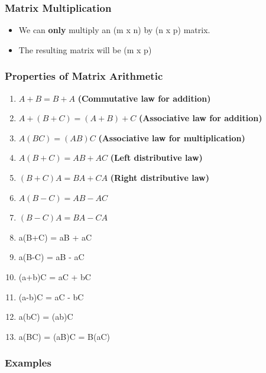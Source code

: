 \documentclass[
  letterpaper,
  DIV=11,
  numbers=noendperiod]{scrartcl}
\providecommand{\tightlist}{%
  \setlength{\itemsep}{0pt}\setlength{\parskip}{0pt}}\usepackage{longtable,booktabs,array}
\begin{document}
\hypertarget{matrix-multiplication}{%
\subsubsection{Matrix Multiplication}\label{matrix-multiplication}}

\begin{itemize}
\tightlist
\item
  We can \textbf{only} multiply an (m x n) by (n x p) matrix.
\item
  The resulting matrix will be (m x p)
\end{itemize}

\hypertarget{properties-of-matrix-arithmetic}{%
\subsubsection{Properties of Matrix
Arithmetic}\label{properties-of-matrix-arithmetic}}

\begin{enumerate}
\def\labelenumi{(\alph{enumi})}
\tightlist
\item
  \(A + B = B + A\) \textbf{(Commutative law for addition)}
\item
  \(A + (B + C) = (A + B) + C\) \textbf{(Associative law for addition)}
\item
  \(A(BC) = (AB)C\) \textbf{(Associative law for multiplication)}
\item
  \(A(B+C) = AB + AC\) \textbf{(Left distributive law)}
\item
  \((B+C)A = BA + CA\) \textbf{(Right distributive law)}
\item
  \(A(B-C) = AB - AC\)
\item
  \((B-C)A = BA - CA\)
\item
  a(B+C) = aB + aC
\item
  a(B-C) = aB - aC
\item
  (a+b)C = aC + bC
\item
  (a-b)C = aC - bC
\item
  a(bC) = (ab)C
\item
  a(BC) = (aB)C = B(aC)
\end{enumerate}

\hypertarget{examples}{%
\subsubsection{Examples}\label{examples}}
\end{document}

